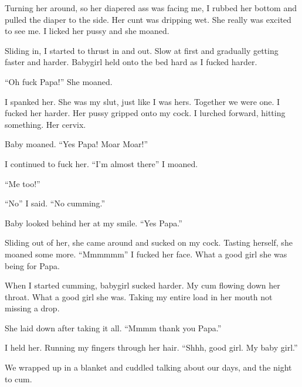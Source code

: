     Turning her around, so her diapered ass was facing me, I rubbed her bottom and pulled the diaper to the side. Her cunt was dripping wet. She really was excited to see me. I licked her pussy and she moaned.

    Sliding in, I started to thrust in and out. Slow at first and gradually getting faster and harder. Babygirl held onto the bed hard as I fucked harder.

    “Oh fuck Papa!” She moaned.

    I spanked her. She was my slut, just like I was hers. Together we were one. I fucked her harder. Her pussy gripped onto my cock. I lurched forward, hitting something. Her cervix.

    Baby moaned. “Yes Papa! Moar Moar!”

    I continued to fuck her. “I’m almost there” I moaned.

   “Me too!”

    “No” I said. “No cumming.”

    Baby looked behind her at my smile. “Yes Papa.”

    Sliding out of her, she came around and sucked on my cock. Tasting herself, she moaned some more. “Mmmmmm” I fucked her face. What a good girl she was being for Papa.

    When I started cumming, babygirl sucked harder. My cum flowing down her throat. What a good girl she was. Taking my entire load in her mouth not missing a drop.

    She laid down after taking it all. “Mmmm thank you Papa.”

    I held her. Running my fingers through her hair. “Shhh, good girl. My baby girl.”

    We wrapped up in a blanket and cuddled talking about our days, and the night to cum.

